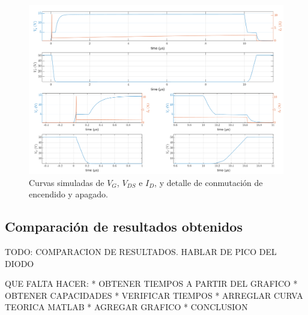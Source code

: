 \documentclass[e4_tp1_main.tex]{subfiles}
\begin{document}
\begin{landscape}
\begin{figure}[h]
  \centering
  \includegraphics[width=\linewidth]{images/ej1/curvas_simuladas.png}
  \caption{Curvas simuladas de $V_G$, $V_{DS}$ e $I_D$, y detalle de conmutación de encendido y apagado.}
  \label{fig:simulation}
\end{figure}
\end{landscape}

\subsection{Comparación de resultados obtenidos}
TODO: COMPARACION DE RESULTADOS. HABLAR DE PICO DEL DIODO

QUE FALTA HACER:
* OBTENER TIEMPOS A PARTIR DEL GRAFICO
* OBTENER CAPACIDADES 
* VERIFICAR TIEMPOS
* ARREGLAR CURVA TEORICA MATLAB
* AGREGAR GRAFICO
* CONCLUSION
\end{document}
